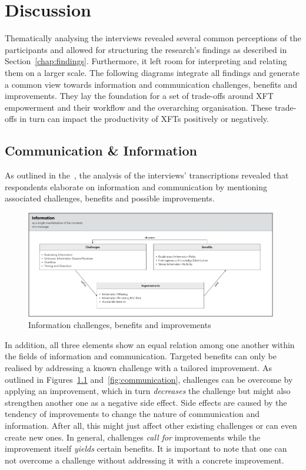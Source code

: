 \chapter{Discussion}
\label{chap:discussion}

Thematically analysing the interviews revealed several common perceptions of the participants and allowed for structuring the research's findings as described in Section~\ref{chap:findings}. Furthermore, it left room for interpreting and relating them on a larger scale. The following diagrams integrate all findings and generate a common view towards information and communication challenges, benefits and improvements. They lay the foundation for a set of trade-offs around \ac{XFT} empowerment and their workflow and the overarching organisation. These trade-offs in turn can impact the productivity of \acp{XFT} positively or negatively.

\section{Communication \& Information}

As outlined in the~, the analysis of the interviews' transcriptions revealed that respondents elaborate on information and communication by mentioning associated challenges, benefits and possible improvements. 

\begin{figure}[h!]
  \centering
  \includegraphics[width=0.98\textwidth]{figures/information.png}
  \caption{Information challenges, benefits and improvements}
  \label{fig:information}
\end{figure}

In addition, all three elements show an equal relation among one another within the fields of information and communication. Targeted benefits can only be realised by addressing a known challenge with a tailored improvement. As outlined in Figures~\ref{fig:information} and~\ref{fig:communication}, challenges can be overcome by applying an improvement, which in turn \emph{decreases} the challenge but might also strengthen another one as a negative side effect. Side effects are caused by the tendency of improvements to change the nature of communication and information. After all, this might just affect other existing challenges or can even create new ones.
In general, challenges \emph{call for} improvements while the improvement itself \emph{yields} certain benefits. It is important to note that one can not overcome a challenge without addressing it with a concrete improvement.

